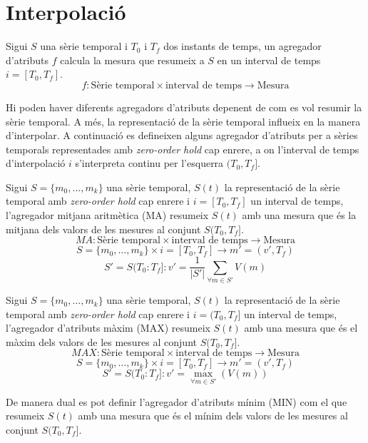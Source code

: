 \newcommand{\prev}{\ant}



\section{Interpolació}

Sigui $S$ una sèrie temporal i $T_0$ i $T_f$ dos instants de temps, un agregador d'atributs $f$ calcula la mesura que resumeix a $S$ en un interval de temps $i=[T_0,T_f]$. 
\[
f: \text{Sèrie temporal} \times \text{interval de temps} \longrightarrow \text{Mesura}
\]

Hi poden haver diferents agregadors d'atributs depenent de com es vol resumir la sèrie temporal. A més, la representació de la sèrie temporal influeix en la manera d'interpolar. A continuació es defineixen alguns agregador d'atributs per a sèries temporals representades amb  \emph{zero-order hold} cap enrere, a on l'interval de temps d'interpolació $i$ s'interpreta continu per l'esquerra $(T_0,T_f]$. 


\begin{definition}
  Sigui $S=\{m_0,\ldots,m_k\}$ una sèrie temporal, $S(t)$ la
  representació de la sèrie temporal amb \emph{zero-order hold} cap
  enrere i $i=[T_0,T_f]$ un interval de temps, l'agregador mitjana
  aritmètica (MA) resumeix $S(t)$ amb una mesura que és la mitjana dels
  valors de les mesures al conjunt $S(T_0,T_f]$.
\[
MA: \text{Sèrie temporal} \times \text{interval de temps}
\longrightarrow \text{Mesura}
\]
\[
S=\{m_0,\ldots,m_k\} \times i=[T_0,T_f] \longrightarrow m'=(v',T_f)
\]
\[
S'=S(T_0:T_f]:
v' = \frac{1}{|S'|} \sum\limits_{\forall m\in S'} V(m)
\]
\end{definition}

\begin{definition}
  Sigui $S=\{m_0,\ldots,m_k\}$ una sèrie temporal, $S(t)$ la
  representació de la sèrie temporal amb \emph{zero-order hold} cap
  enrere i $i=(T_0,T_f]$ un interval de temps, l'agregador d'atributs màxim
  (MAX) resumeix $S(t)$ amb una mesura que és el màxim dels valors
  de les mesures al conjunt $S(T_0,T_f]$.
\[
MAX: \text{Sèrie temporal} \times \text{interval de temps} \longrightarrow \text{Mesura}
\]
\[
S=\{m_0,\ldots,m_k\} \times i=[T_0,T_f]  \longrightarrow m'=(v',T_f)
\]
\[
S'=S(T_0:T_f]:
v' = \max_{\forall m \in S'}(V(m))
\]
\end{definition}

De manera dual es pot definir l'agregador d'atributs mínim (MIN) com el
que resumeix $S(t)$ amb una mesura que és el mínim dels valors de les
mesures al conjunt $S(T_0,T_f]$.


